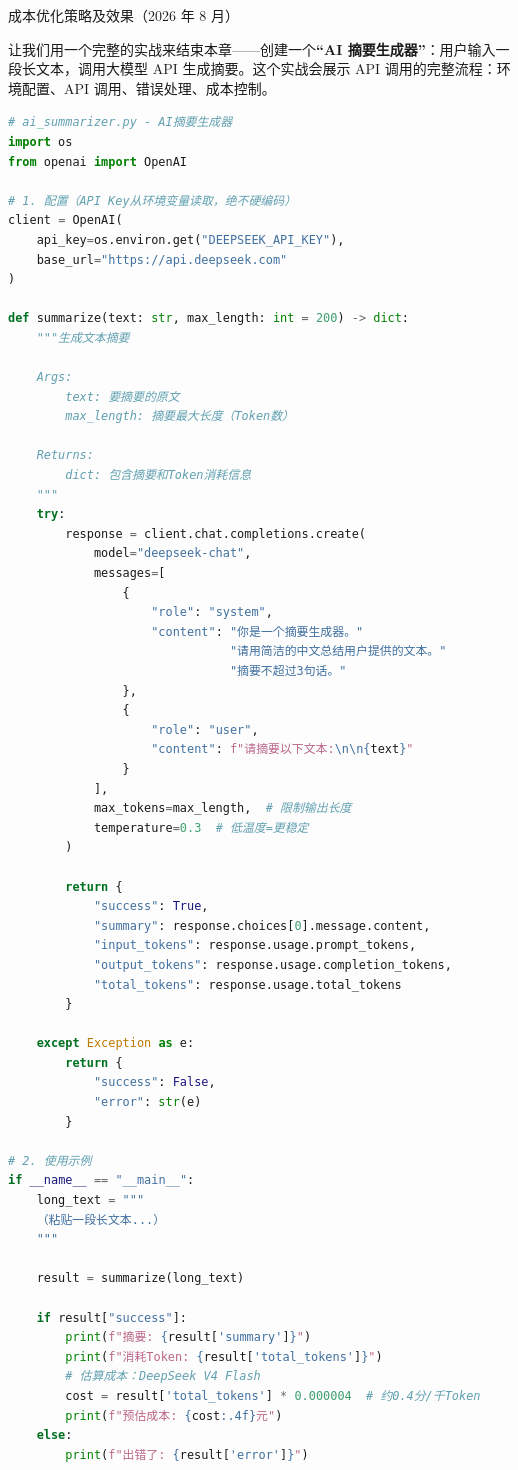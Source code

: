 \begin{center}\small\color{gray}成本优化策略及效果（2026 年 8 月）\end{center}


让我们用一个完整的实战来结束本章——创建一个\textbf{“AI 摘要生成器”}：用户输入一段长文本，调用大模型 API 生成摘要。这个实战会展示 API 调用的完整流程：环境配置、API 调用、错误处理、成本控制。

\begin{lstlisting}[language=Python]
# ai_summarizer.py - AI摘要生成器
import os
from openai import OpenAI

# 1. 配置（API Key从环境变量读取，绝不硬编码）
client = OpenAI(
    api_key=os.environ.get("DEEPSEEK_API_KEY"),
    base_url="https://api.deepseek.com"
)

def summarize(text: str, max_length: int = 200) -> dict:
    """生成文本摘要

    Args:
        text: 要摘要的原文
        max_length: 摘要最大长度（Token数）

    Returns:
        dict: 包含摘要和Token消耗信息
    """
    try:
        response = client.chat.completions.create(
            model="deepseek-chat",
            messages=[
                {
                    "role": "system",
                    "content": "你是一个摘要生成器。"
                               "请用简洁的中文总结用户提供的文本。"
                               "摘要不超过3句话。"
                },
                {
                    "role": "user",
                    "content": f"请摘要以下文本:\n\n{text}"
                }
            ],
            max_tokens=max_length,  # 限制输出长度
            temperature=0.3  # 低温度=更稳定
        )

        return {
            "success": True,
            "summary": response.choices[0].message.content,
            "input_tokens": response.usage.prompt_tokens,
            "output_tokens": response.usage.completion_tokens,
            "total_tokens": response.usage.total_tokens
        }

    except Exception as e:
        return {
            "success": False,
            "error": str(e)
        }

# 2. 使用示例
if __name__ == "__main__":
    long_text = """
    （粘贴一段长文本...）
    """

    result = summarize(long_text)

    if result["success"]:
        print(f"摘要: {result['summary']}")
        print(f"消耗Token: {result['total_tokens']}")
        # 估算成本：DeepSeek V4 Flash
        cost = result['total_tokens'] * 0.000004  # 约0.4分/千Token
        print(f"预估成本: {cost:.4f}元")
    else:
        print(f"出错了: {result['error']}")
\end{lstlisting}

